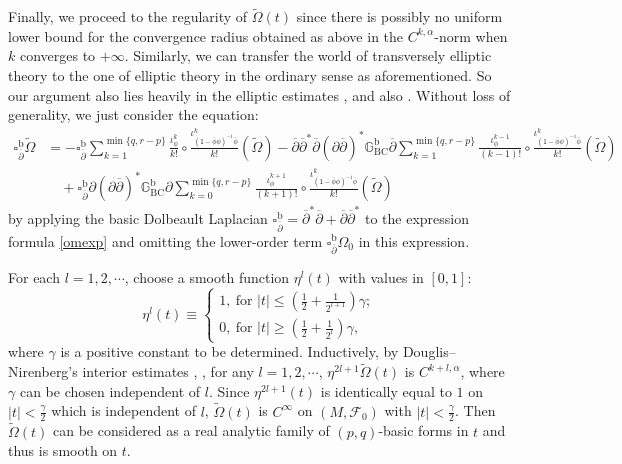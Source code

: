 \documentclass[12pt]{amsart}
\numberwithin{equation}{section}
\theoremstyle{definition}
\theoremstyle{definition}
\theoremstyle{definition}
\renewcommand{\1}{\mathsf{1}}
\newcommand{\G}{\mathbb{G}}
\newcommand{\db}{\overline{\partial}}
\newcommand{\Om}{\Omega}
\renewcommand{\>}{\rightarrow}
\newcommand{\p}{\partial}
\newcommand{\bp}{\overline\partial}
\def\p{\partial}
\def\b{\bar}
\def\mc{\mathcal}
\theoremstyle{plain} %
\theoremstyle{plain} %
\theoremstyle{plain} %
\begin{document}
	
	Finally, we proceed to the regularity of $\widetilde{\Omega}(t)$ since there is possibly no uniform
	lower bound for the convergence radius obtained as above in the $C^{k,\alpha}$-norm when $k$ converges to $+\infty$. Similarly, we can transfer the world of transversely elliptic theory to the one of elliptic theory in the ordinary sense as aforementioned. So our argument also lies heavily in the elliptic estimates \cite[Appendix  8]{Ko86}, \cite{DN55} and also \cite[Subsection 3.2]{RWZ21}.
	Without loss of generality, we just consider the equation:
	$$\label{reg-eqn-1}
	\begin{aligned}
		\square_{\bp}^\mathrm b\widetilde{\Omega}&=-\square^\mathrm b_{\bp}\sum_{k=1}^{\min\{q,r-p\}}\frac{ {\iota}^{k}_{ \phi}}{k!}\circ\frac{ {\iota}^{k}_{(\1-\b{ \phi} \phi)^{-1}\b{ \phi}}}{k!}(\widetilde{\Omega})
		-\db \db^*\db(\p\db)^*\G_{\mathrm {BC}}^\mathrm b\db\sum_{k=1}^{\min\{q,r-p\}}\frac{ {\iota}^{k-1}_{ \phi}}{(k-1)!}\circ\frac{ {\iota}^{k}_{(\1-\b{ \phi} \phi)^{-1}\b{ \phi}}}{k!}(\widetilde{\Omega})\\
		&\quad +\square_{\bp}^\mathrm b\p(\p\db)^*\G_{\mathrm {BC}}^\mathrm b\p\sum_{k=0}^{\min\{q,r-p\}} \frac{ {\iota}^{k+1}_{ \phi}}{(k+1)!}\circ\frac{ {\iota}^{k}_{(\1-\b{ \phi} \phi)^{-1}\b{ \phi}}}{k!}(\widetilde{\Omega})
	\end{aligned}
	$$
	by applying the basic Dolbeault Laplacian
	$\square^\mathrm b_{\bp}=\db^*\db+\db\db^*$ to the expression formula \eqref{omexp} and omitting the lower-order term $\square^\mathrm b_{\bp} \Om_0$ in this expression.
	
	For each $l=1,2,\cdots$, choose a
	smooth function $\eta^l(t)$ with values in $[0,1]$:
	$$\label{eta-l}
	\eta^l(t)\equiv
	\begin{cases}
		1,\ \text{for $|t|\leq (\frac{1}{2}+\frac{1}{2^{l+1}})\gamma$};\\
		0,\ \text{for $|t|\geq (\frac{1}{2}+\frac{1}{2^{l}})\gamma$},
	\end{cases}
	$$
	where $\gamma$ is a positive constant to be determined.
	Inductively, by Douglis--Nirenberg's
	interior estimates \cite[Theorem 2.3 in the Appendix]{Ko86}, \cite{DN55}, for any $l=1,2,\cdots$,
	$\eta^{2l+1}\widetilde{\Omega}(t)$ is $C^{k+l, \alpha}$, where
	$\gamma$ can be chosen independent of $l$. Since $\eta^{2l+1}(t)$ is
	identically equal to $1$ on $|t|<\frac{\gamma}{2}$ which is independent
	of $l$, $\widetilde{\Omega}(t)$ is $C^{\infty}$ on $(M,\mc F_0)$ with
	$|t|<\frac{\gamma}{2}$.  Then $\widetilde{\Omega}(t)$ can be considered as a real analytic family of $(p,q)$-basic   forms in $t$
	and thus is smooth on $t$.
	
\end{document}
